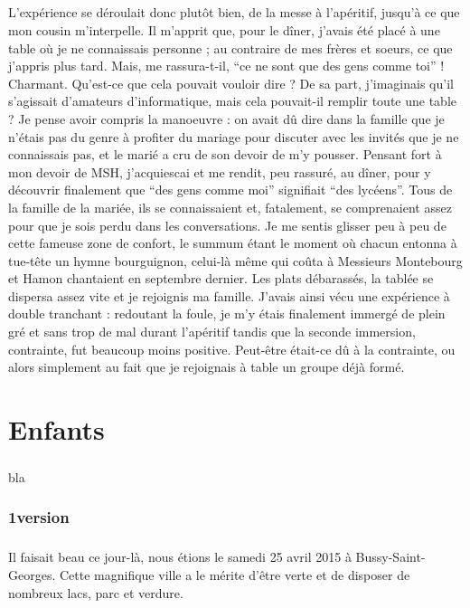 \paragraph{}
L’expérience se déroulait donc plutôt bien, de la messe à l’apéritif, jusqu’à ce que mon cousin m’interpelle. Il m’apprit que, pour le dîner, j’avais été placé à une table où je ne connaissais personne ; au contraire de mes frères et soeurs, ce que j’appris plus tard. Mais, me rassura-t-il, “ce ne sont que des gens comme toi” ! Charmant. Qu’est-ce que cela pouvait vouloir dire ? De sa part, j’imaginais qu’il s’agissait d’amateurs d’informatique, mais cela pouvait-il remplir toute une table ? Je pense avoir compris la manoeuvre : on avait dû dire dans la famille que je n’étais pas du genre à profiter du mariage pour discuter avec les invités que je ne connaissais pas, et le marié a cru de son devoir de m’y pousser. Pensant fort à mon devoir de MSH, j’acquiescai et me rendit, peu rassuré, au dîner, pour y découvrir finalement que “des gens comme moi” signifiait “des lycéens”. Tous de la famille de la mariée, ils se connaissaient et, fatalement, se comprenaient assez pour que je sois perdu dans les conversations. Je me sentis glisser peu à peu de cette fameuse zone de confort, le summum étant le moment où chacun entonna à tue-tête un hymne bourguignon, celui-là même qui coûta à Messieurs Montebourg et Hamon chantaient en septembre dernier.
Les plats débarassés, la tablée se dispersa assez vite et je rejoignis ma famille. J’avais ainsi vécu une expérience à double tranchant : redoutant la foule, je m’y étais finalement immergé de plein gré et sans trop de mal durant l’apéritif tandis que la seconde immersion, contrainte, fut beaucoup moins positive. Peut-être était-ce dû à la contrainte, ou alors simplement au fait que je rejoignais à table un groupe déjà formé.


\chapter{Enfants}
\paragraph{}
bla

\subsection{1\ier version}
\paragraph{}
Il faisait beau ce jour-là, nous étions le samedi 25 avril
2015 à Bussy-Saint-Georges. Cette magnifique ville a le
mérite d'être verte et de disposer de nombreux lacs, parc
et verdure.
